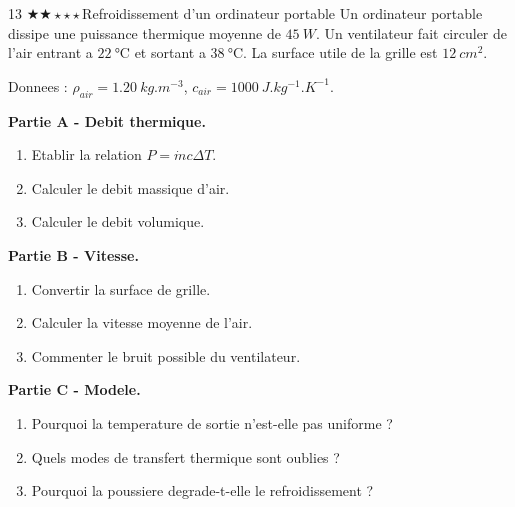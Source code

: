 \documentclass[11pt,a4paper]{article}
\newcommand{\difftwo}{\(\bigstar\bigstar\star\star\star\)}
\begin{document}
\begin{probleme}{13 \difftwo}{Refroidissement d'un ordinateur portable}
Un ordinateur portable dissipe une puissance thermique moyenne de \(\SI{45}{W}\). Un ventilateur fait circuler de l'air entrant a \(\SI{22}{\celsius}\) et sortant a \(\SI{38}{\celsius}\). La surface utile de la grille est \(\SI{12}{cm^2}\).

Donnees : \(\rho_{air}=\SI{1.20}{kg.m^{-3}}\), \(c_{air}=\SI{1000}{J.kg^{-1}.K^{-1}}\).

\textbf{Partie A - Debit thermique.}
\begin{enumerate}
\item Etablir la relation \(P=\dot m c\Delta T\).
\item Calculer le debit massique d'air.
\item Calculer le debit volumique.
\end{enumerate}

\textbf{Partie B - Vitesse.}
\begin{enumerate}[resume]
\item Convertir la surface de grille.
\item Calculer la vitesse moyenne de l'air.
\item Commenter le bruit possible du ventilateur.
\end{enumerate}

\textbf{Partie C - Modele.}
\begin{enumerate}[resume]
\item Pourquoi la temperature de sortie n'est-elle pas uniforme ?
\item Quels modes de transfert thermique sont oublies ?
\item Pourquoi la poussiere degrade-t-elle le refroidissement ?
\end{enumerate}
\end{probleme}
\end{document}
